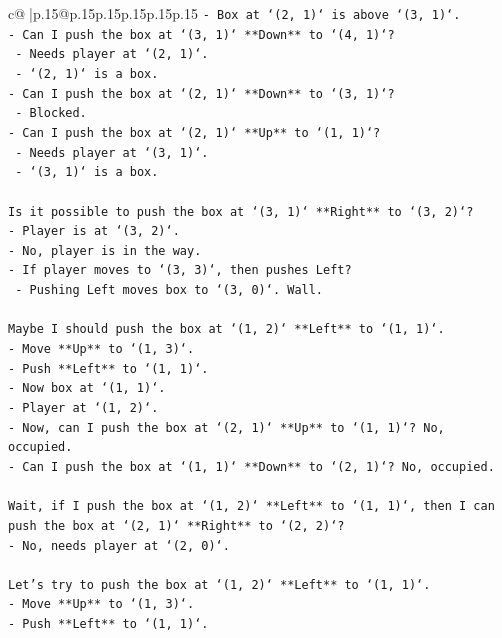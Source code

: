 \documentclass{article}
\begin{document}
{\begin{supertabular}{c@{$\;$}|p{.15\linewidth}@{}p{.15\linewidth}p{.15\linewidth}p{.15\linewidth}p{.15\linewidth}p{.15\linewidth}}
{{{\texttt{{-} Box at `(2, 1)` is above `(3, 1)`.} \\
\texttt{{-} Can I push the box at `(3, 1)` **Down** to `(4, 1)`?} \\
\texttt{  {-} Needs player at `(2, 1)`.} \\
\texttt{  {-} `(2, 1)` is a box.} \\
\texttt{{-} Can I push the box at `(2, 1)` **Down** to `(3, 1)`?} \\
\texttt{  {-} Blocked.} \\
\texttt{{-} Can I push the box at `(2, 1)` **Up** to `(1, 1)`?} \\
\texttt{  {-} Needs player at `(3, 1)`.} \\
\texttt{  {-} `(3, 1)` is a box.} \\
\\ 
\texttt{Is it possible to push the box at `(3, 1)` **Right** to `(3, 2)`?} \\
\texttt{{-} Player is at `(3, 2)`.} \\
\texttt{{-} No, player is in the way.} \\
\texttt{{-} If player moves to `(3, 3)`, then pushes Left?} \\
\texttt{  {-} Pushing Left moves box to `(3, 0)`. Wall.} \\
\\ 
\texttt{Maybe I should push the box at `(1, 2)` **Left** to `(1, 1)`.} \\
\texttt{{-} Move **Up** to `(1, 3)`.} \\
\texttt{{-} Push **Left** to `(1, 1)`.} \\
\texttt{{-} Now box at `(1, 1)`.} \\
\texttt{{-} Player at `(1, 2)`.} \\
\texttt{{-} Now, can I push the box at `(2, 1)` **Up** to `(1, 1)`? No, occupied.} \\
\texttt{{-} Can I push the box at `(1, 1)` **Down** to `(2, 1)`? No, occupied.} \\
\\ 
\texttt{Wait, if I push the box at `(1, 2)` **Left** to `(1, 1)`, then I can push the box at `(2, 1)` **Right** to `(2, 2)`?} \\
\texttt{{-} No, needs player at `(2, 0)`.} \\
\\ 
\texttt{Let's try to push the box at `(1, 2)` **Left** to `(1, 1)`.} \\
\texttt{{-} Move **Up** to `(1, 3)`.} \\
\texttt{{-} Push **Left** to `(1, 1)`.} \\
}}}
\end{supertabular}}
\end{document}

